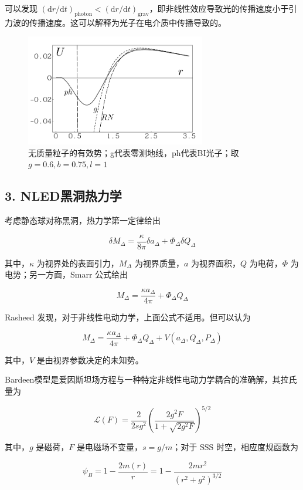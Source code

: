 \documentclass[aps,prl,preprint,groupedaddress,showkeys]{revtex4-2}
\begin{document}
可以发现 $(\mathrm{d}r/\mathrm{d}t)_{\mathrm{photon}}<(\mathrm{d}r/\mathrm{d}t)_{\mathrm{grav}}$，即非线性效应导致光的传播速度小于引力波的传播速度。这可以解释为光子在电介质中传播导致的。

\begin{figure}[htbp]
    \centering
    \includegraphics[width=0.7\textwidth]{fig/fig7.png}
    \caption{无质量粒子的有效势；g代表零测地线，ph代表BI光子；取 $g=0.6,b=0.75,l=1$}
\end{figure}

\subsection{3. NLED黑洞热力学}

考虑静态球对称黑洞，热力学第一定律给出

$$
\delta M_{\Delta} = \frac{\kappa }{8\pi } \delta a_{\Delta} + \Phi_\Delta \delta Q_\Delta
$$

其中，$\kappa$ 为视界处的表面引力，$M_\Delta$ 为视界质量，$a$ 为视界面积，$Q$ 为电荷，$\Phi$ 为电势；另一方面，Smarr 公式给出

$$
M_\Delta = \frac{\kappa a_\Delta }{4\pi } + \Phi_\Delta Q_\Delta
$$

Rasheed 发现，对于非线性电动力学，上面公式不适用。但可以认为

$$
M_\Delta = \frac{\kappa a_\Delta }{4\pi } + \Phi_\Delta Q_\Delta + V\left(a_\Delta , Q_\Delta , P_\Delta \right)
$$

其中，$V$ 是由视界参数决定的未知势。

Bardeen模型\cite{ayon2000bardeen}是爱因斯坦场方程与一种特定非线性电动力学耦合的准确解，其拉氏量为

$$
\mathcal{L}(F)
=\frac{2 }{2 sg^2 } \left(\frac{2g^2 F }{1+\sqrt{2g^2 F} }  \right)^{5/2}
$$

其中，$g$ 是磁荷，$F$ 是电磁场不变量，$s=g/m$；对于 SSS 时空，相应度规函数为

$$
\psi_B
=1-\frac{2 m(r) }{r } 
=1-\frac{2mr^2 }{\left(r^2+g^2 \right)^{3/2} }
$$
\end{document}
